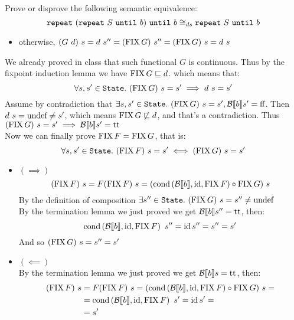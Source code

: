 \begin{exercise}{
    Prove or disprove the following semantic equivalence:
    \[ \texttt{repeat}\ (\texttt{repeat}\ S\ \texttt{until}\ b)\ \texttt{until}\ b \cong_{ds} \texttt{repeat}\ S\ \texttt{until}\ b \]
}
\begin{itemize}
\begin{itemize}
                \item otherwise, $(G\ d)\ s = d\ s'' = (\operatorname{FIX} G)\ s'' = (\operatorname{FIX} G)\ s = d\ s$
            \end{itemize}
    \end{itemize}
    We already proved in class that such functional $G$ is continuous.
    Thus by the fixpoint induction lemma we have $\operatorname{FIX} G \sqsubseteq d$. which means that:
    \[ \forall s, s' \in \texttt{State}.\ (\operatorname{FIX} G)\ s = s' \implies d\ s = s' \]
    Assume by contradiction that $\exists s, s' \in \texttt{State}.\ (\operatorname{FIX} G)\ s = s', \mathcal{B} \llbracket b \rrbracket s' = \text{ff} $. Then $d\ s = \text{undef} \neq s'$, which means $\operatorname{FIX} G \not\sqsubseteq d$, and that's a contradiction. Thus $(\operatorname{FIX} G)\ s = s' \implies \mathcal{B} \llbracket b \rrbracket s' = \text{tt}$ \\
    Now we can finally prove $\operatorname{FIX} F = \operatorname{FIX} G$, that is:
    \[ \forall s, s' \in \texttt{State}.\ (\operatorname{FIX} F)\ s = s' \iff (\operatorname{FIX} G)\ s = s' \]
    \begin{itemize}
        \item $(\implies)$
            \[ (\operatorname{FIX} F)\ s = F(\operatorname{FIX} F)\ s = (\operatorname{cond}\left(\mathcal{B} \llbracket b \rrbracket, \operatorname{id}, \operatorname{FIX} F\right) \circ \operatorname{FIX} G)\ s \]
            By the definition of composition $\exists s'' \in \texttt{State}.\ (\operatorname{FIX} G)\ s = s'' \neq \text{undef}$ \\
            By the termination lemma we just proved we get $\mathcal{B} \llbracket b \rrbracket s'' = \text{tt}$, then:
            \[ \operatorname{cond}\left(\mathcal{B} \llbracket b \rrbracket, \operatorname{id}, \operatorname{FIX} F\right)\ s'' = \operatorname{id} s'' = s'' = s' \]
            And so $(\operatorname{FIX} G)\ s = s'' = s'$
        \item $(\impliedby)$ \\
            By the termination lemma we just proved we get $\mathcal{B} \llbracket b \rrbracket s = \text{tt}$, then:
            \begin{align*}
                (\operatorname{FIX} F)\ s &= F(\operatorname{FIX} F)\ s = (\operatorname{cond}\left(\mathcal{B} \llbracket b \rrbracket, \operatorname{id}, \operatorname{FIX} F\right) \circ \operatorname{FIX} G)\ s = \\
                &= \operatorname{cond}\left(\mathcal{B} \llbracket b \rrbracket, \operatorname{id}, \operatorname{FIX} F\right)\ s' = \operatorname{id} s' = \\
                &= s'
            \end{align*}
    \end{itemize}
\end{exercise}
